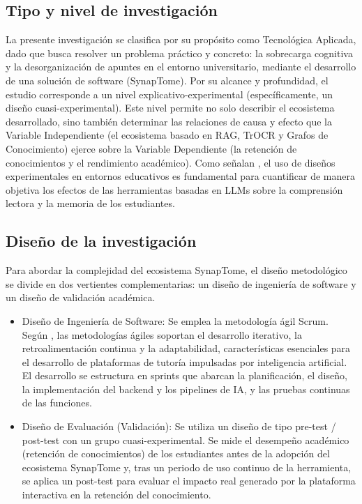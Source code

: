 
\subsection{Tipo y nivel de investigación}

La presente investigación se clasifica por su propósito como Tecnológica Aplicada, dado que busca resolver un problema práctico y concreto: la sobrecarga cognitiva y la desorganización de apuntes en el entorno universitario, mediante el desarrollo de una solución de software (SynapTome). Por su alcance y profundidad, el estudio corresponde a un nivel explicativo-experimental (específicamente, un diseño cuasi-experimental). Este nivel permite no solo describir el ecosistema desarrollado, sino también determinar las relaciones de causa y efecto que la Variable Independiente (el ecosistema basado en RAG, TrOCR y Grafos de Conocimiento) ejerce sobre la Variable Dependiente (la retención de conocimientos y el rendimiento académico). Como señalan \textcite{Kreijkes2026}, el uso de diseños experimentales en entornos educativos es fundamental para cuantificar de manera objetiva los efectos de las herramientas basadas en LLMs sobre la comprensión lectora y la memoria de los estudiantes.

\subsection{Diseño de la investigación}

Para abordar la complejidad del ecosistema SynapTome, el diseño metodológico se divide en dos vertientes complementarias: un diseño de ingeniería de software y un diseño de validación académica.

\begin{itemize}
  \item Diseño de Ingeniería de Software: Se emplea la metodología ágil Scrum. Según \textcite{Afian2025}, las metodologías ágiles soportan el desarrollo iterativo, la retroalimentación continua y la adaptabilidad, características esenciales para el desarrollo de plataformas de tutoría impulsadas por inteligencia artificial. El desarrollo se estructura en sprints que abarcan la planificación, el diseño, la implementación del backend y los pipelines de IA, y las pruebas continuas de las funciones.
  \item Diseño de Evaluación (Validación): Se utiliza un diseño de tipo pre-test / post-test con un grupo cuasi-experimental. Se mide el desempeño académico (retención de conocimientos) de los estudiantes antes de la adopción del ecosistema SynapTome y, tras un periodo de uso continuo de la herramienta, se aplica un post-test para evaluar el impacto real generado por la plataforma interactiva en la retención del conocimiento.
\end{itemize}

